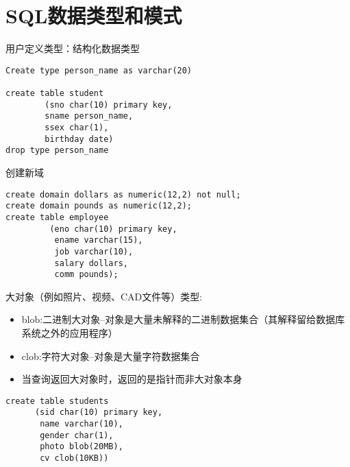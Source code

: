 \section{SQL数据类型和模式}

用户定义类型：结构化数据类型
\begin{lstlisting}[style=sqlstyle]
Create type person_name as varchar(20)

create table student
        (sno char(10) primary key,
        sname person_name,
        ssex char(1),
        birthday date)
drop type person_name
\end{lstlisting}

创建新域
\begin{lstlisting}[style=sqlstyle]
create domain dollars as numeric(12,2) not null;
create domain pounds as numeric(12,2);
create table employee
         (eno char(10) primary key,
          ename varchar(15),
          job varchar(10),
          salary dollars,
          comm pounds);    
\end{lstlisting}

大对象（例如照片、视频、CAD文件等）类型:
\begin{itemize}
    \item blob:二进制大对象--对象是大量未解释的二进制数据集合（其解释留给数据库系统之外的应用程序）
    \item clob:字符大对象--对象是大量字符数据集合
    \item 当查询返回大对象时，返回的是指针而非大对象本身
\end{itemize}

\begin{lstlisting}[style=sqlstyle]
create table students
      (sid char(10) primary key,
       name varchar(10),
       gender char(1),
       photo blob(20MB),
       cv clob(10KB))    
\end{lstlisting}